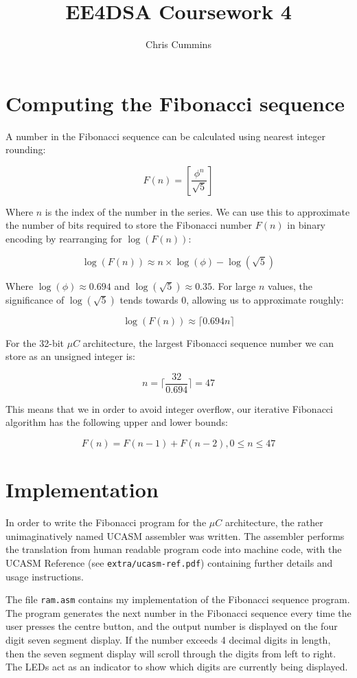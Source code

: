 \documentclass[12pt,a4paper]{article}
\title{EE4DSA Coursework 4}
\author{Chris Cummins}
\begin{document}
\maketitle

\section{Computing the Fibonacci sequence}

A number in the Fibonacci sequence can be calculated using nearest
integer rounding:

$$F(n) = \left[\frac{\phi^n}{\sqrt{5}}\right] $$

Where $n$ is the index of the number in the series. We can use this to
approximate the number of bits required to store the Fibonacci number
$F(n)$ in binary encoding by rearranging for $\log(F(n))$:

$$\log(F(n)) \approx n \times \log(\phi) - \log(\sqrt{5})$$

Where $\log(\phi) \approx 0.694$ and $\log(\sqrt{5}) \approx
0.35$. For large $n$ values, the significance of $\log(\sqrt{5})$
tends towards $0$, allowing us to approximate roughly:

$$\log(F(n)) \approx \lceil 0.694n \rceil$$

For the 32-bit $\mu C$ architecture, the largest Fibonacci sequence
number we can store as an unsigned integer is:

$$n = \lceil \frac{32}{0.694} \rceil = 47$$

This means that we in order to avoid integer overflow, our iterative
Fibonacci algorithm has the following upper and lower bounds:

$$F(n) = F(n - 1) + F(n - 2), 0 \le n \le 47$$

\section{Implementation}

In order to write the Fibonacci program for the $\mu C$ architecture,
the rather unimaginatively named UCASM assembler was written. The
assembler performs the translation from human readable program code
into machine code, with the UCASM Reference (see
\texttt{extra/ucasm-ref.pdf}) containing further details and usage
instructions.

The file \texttt{ram.asm} contains my implementation of the Fibonacci
sequence program. The program generates the next number in the
Fibonacci sequence every time the user presses the centre button, and
the output number is displayed on the four digit seven segment
display. If the number exceeds 4 decimal digits in length, then the
seven segment display will scroll through the digits from left to
right. The LEDs act as an indicator to show which digits are currently
being displayed.
\end{document}
